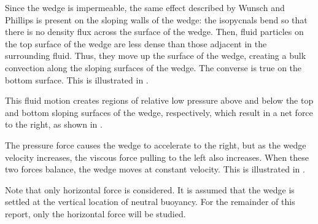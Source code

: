 \documentclass[12pt]{article}
\begin{document}

Since the wedge is impermeable, the same effect described by Wunsch and Phillips is present on the sloping walls of the wedge: the isopycnals bend so that there is no density flux across the surface of the wedge. Then, fluid particles on the top surface of the wedge are less dense than those adjacent in the surrounding fluid. Thus, they move up the surface of the wedge, creating a bulk convection along the sloping surfaces of the wedge. The converse is true on the bottom surface. This is illustrated in .


This fluid motion creates regions of relative low pressure above and below the top and bottom sloping surfaces of the wedge, respectively, which result in a net force to the right, as shown in .


The pressure force causes the wedge to accelerate to the right, but as the wedge velocity increases, the viscous force pulling to the left also increases. When these two forces balance, the wedge moves at constant velocity. This is illustrated in .


Note that only horizontal force is considered. It is assumed that the wedge is settled at the vertical location of neutral buoyancy. For the remainder of this report, only the horizontal force will be studied.
\end{document}

